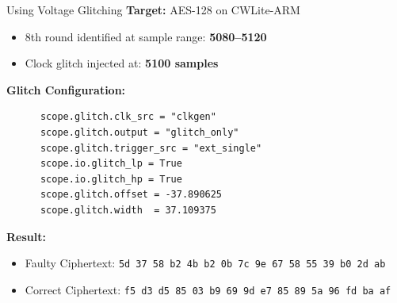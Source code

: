 \documentclass{beamer}
\newenvironment{tres important}[2][]{
	\setkeys{EmphEqEnv}{#2}
	\setkeys{EmphEqOpt}{box={\setlength{\fboxsep}{10pt}\fcolorbox{myNewColorA}{white}},#1}
	\EmphEqMainEnv}
{\endEmphEqMainEnv}
\begin{document}
\begin{frame}[fragile]{Using Voltage Glitching}
    \textbf{Target:} AES-128 on CWLite-ARM
    
    \vspace{1mm}
    \begin{itemize}
      \item 8th round identified at sample range: \textbf{5080–5120}
      \item Clock glitch injected at: \textbf{5100 samples}
    \end{itemize}
    
    \textbf{Glitch Configuration:}
    \vspace{1mm}
    
    \begin{lstlisting}
      scope.glitch.clk_src = "clkgen"
      scope.glitch.output = "glitch_only"
      scope.glitch.trigger_src = "ext_single"
      scope.io.glitch_lp = True
      scope.io.glitch_hp = True
      scope.glitch.offset = -37.890625
      scope.glitch.width  = 37.109375
    \end{lstlisting}
    
    \textbf{Result:}
    \begin{itemize}
      \item Faulty Ciphertext: \texttt{5d 37 58 b2 4b b2 0b 7c 9e 67 58 55 39 b0 2d ab}
      \item Correct Ciphertext: \texttt{f5 d3 d5 85 03 b9 69 9d e7 85 89 5a 96 fd ba af}
    \end{itemize}
    \end{frame}
  
\end{document}
